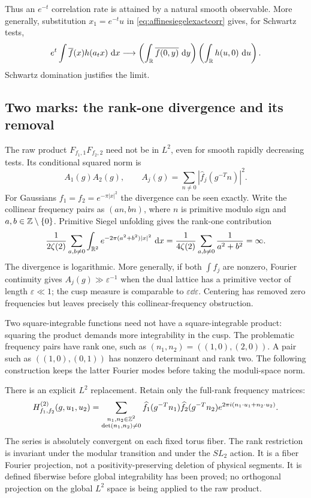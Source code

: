 Thus an $e^{-t}$ correlation rate is attained by a natural smooth
observable. More generally, substitution $x_1=e^{-t}u$ in
\eqref{eq:affinesiegelexactcorr} gives, for Schwartz tests,
\[
 e^t\int\overline f(x)h(a_tx)\,\mathop{}\!\mathrm d x
 \longrightarrow
 \left(\int_\mathbb R\overline{f(0,y)}\,\mathop{}\!\mathrm d y\right)
 \left(\int_\mathbb R h(u,0)\,\mathop{}\!\mathrm d u\right).
\]
Schwartz domination justifies the limit.

\subsection{Two marks: the rank-one divergence and its removal}
\label{subsec:affineranktwo}

The raw product $F_{f_1,1}F_{f_2,2}$ need not be in $L^2$, even for
smooth rapidly decreasing tests. Its conditional squared norm is
\[
 A_1(g)A_2(g),\qquad
 A_j(g)=\sum_{n\ne0}|\widehat f_j(g^{-T}n)|^2.
\]
For Gaussians $f_1=f_2=e^{-\pi|x|^2}$ the divergence can be seen
exactly. Write the collinear frequency pairs as $(an,bn)$, where
$n$ is primitive modulo sign and $a,b\in\mathbb Z\setminus\{0\}$.
Primitive Siegel unfolding gives the rank-one contribution
\[
 \frac1{2\zeta(2)}\sum_{a,b\ne0}
       \int_{\mathbb R^2}e^{-2\pi(a^2+b^2)|x|^2}\,\mathop{}\!\mathrm d x
 =\frac1{4\zeta(2)}\sum_{a,b\ne0}\frac1{a^2+b^2}
 =\infty.
\]
The divergence is logarithmic. More generally, if both $\int f_j$ are
nonzero, Fourier continuity gives $A_j(g)\gg\varepsilon^{-1}$ when
the dual lattice has a primitive vector of length $\varepsilon\ll1$;
the cusp measure is comparable to $\varepsilon\dd\varepsilon$.
Centering has removed zero frequencies but leaves precisely this
collinear-frequency obstruction.

Two square-integrable functions need not have a square-integrable
product: squaring the product demands more integrability in the cusp.
The problematic frequency pairs have rank one, such as
$(n_1,n_2)=((1,0),(2,0))$. A pair such as $((1,0),(0,1))$
has nonzero determinant and rank two. The following construction
keeps the latter Fourier modes before taking the moduli-space norm.

There is an explicit $L^2$ replacement. Retain only the full-rank
frequency matrices:
\begin{equation}
 H_{f_1,f_2}^{(2)}(g,u_1,u_2)
 =\sum_{\substack{n_1,n_2\in\mathbb Z^2\\\det(n_1,n_2)\ne0}}
 \widehat f_1(g^{-T}n_1)\widehat f_2(g^{-T}n_2)
 e^{2\pi i(n_1\cdot u_1+n_2\cdot u_2)}.
 \label{eq:affineranktwoobservable}
\end{equation}
The series is absolutely convergent on each fixed torus fiber.
The rank restriction is invariant under the modular transition and
under the $SL_2$ action. It is a fiber Fourier projection, not a
positivity-preserving deletion of physical segments. It is defined
fiberwise before global integrability has been proved; no orthogonal
projection on the global $L^2$ space is being applied to the raw product.

